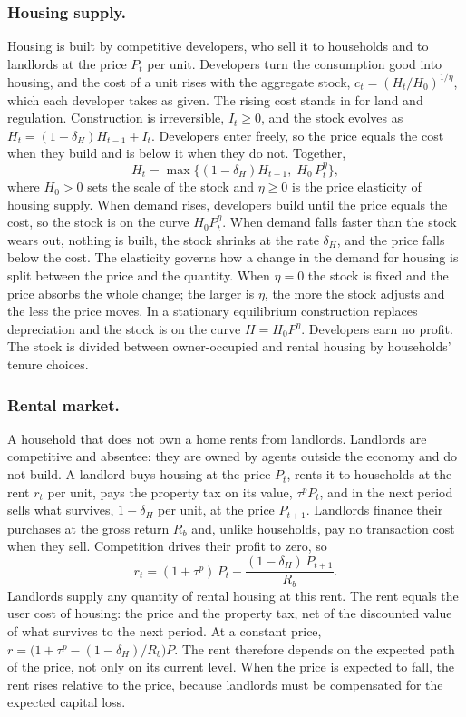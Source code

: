 \subsubsection*{Housing supply.}
Housing is built by competitive developers, who sell it to households and to
landlords at the price $P_t$ per unit. Developers turn the consumption good
into housing, and the cost of a unit rises with the aggregate stock,
$c_t=(H_t/H_0)^{1/\eta}$, which each developer takes as given. The rising cost
stands in for land and regulation. Construction is irreversible, $I_t\ge0$,
and the stock evolves as $H_t=(1-\delta_H)H_{t-1}+I_t$. Developers enter
freely, so the price equals the cost when they build and is below it when they
do not. Together,
\begin{equation}
 H_t=\max\bigl\{(1-\delta_H)H_{t-1},\;H_0\,P_t^{\eta}\bigr\},
 \label{eq:m-supply}
\end{equation}
where $H_0>0$ sets the scale of the stock and $\eta\ge0$ is the price
elasticity of housing supply. When demand rises, developers build until the
price equals the cost, so the stock is on the curve $H_0P_t^{\eta}$. When
demand falls faster than the stock wears out, nothing is built, the stock
shrinks at the rate $\delta_H$, and the price falls below the cost. The
elasticity governs how a change in the demand for housing is split between
the price and the quantity. When $\eta=0$ the stock is fixed and the price
absorbs the whole change; the larger is $\eta$, the more the stock adjusts and
the less the price moves. In a stationary equilibrium construction replaces
depreciation and the stock is on the curve $H=H_0P^{\eta}$. Developers earn no
profit. The stock is divided between owner-occupied and rental housing by
households' tenure choices.

\subsubsection*{Rental market.}
A household that does not own a home rents from landlords. Landlords are
competitive and absentee: they are owned by agents outside the economy and do
not build. A landlord buys housing at the price $P_t$, rents it to households
at the rent $r_t$ per unit, pays the property tax on its value, $\tau^pP_t$,
and in the next period sells what survives, $1-\delta_H$ per unit, at the
price $P_{t+1}$. Landlords finance their purchases at the gross return $R_b$
and, unlike households, pay no transaction cost when they sell. Competition
drives their profit to zero, so
\begin{equation}
 r_t=(1+\tau^p)\,P_t-\frac{(1-\delta_H)\,P_{t+1}}{R_b} .
 \label{eq:m-rent}
\end{equation}
Landlords supply any quantity of rental housing at this rent. The rent equals
the user cost of housing: the price and the property tax, net of the
discounted value of what survives to the next period. At a constant price,
$r=\bigl(1+\tau^p-(1-\delta_H)/R_b\bigr)P$. The rent therefore depends on the
expected path of the price, not only on its current level. When the price is
expected to fall, the rent rises relative to the price, because landlords must
be compensated for the expected capital loss.

